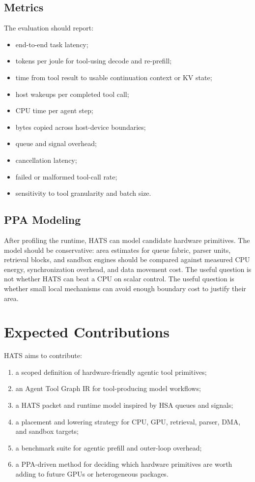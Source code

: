 \documentclass[11pt]{article}
\begin{document}
\subsection{Metrics}

The evaluation should report:

\begin{itemize}[leftmargin=*]
  \item end-to-end task latency;
  \item tokens per joule for tool-using decode and re-prefill;
  \item time from tool result to usable continuation context or KV state;
  \item host wakeups per completed tool call;
  \item CPU time per agent step;
  \item bytes copied across host-device boundaries;
  \item queue and signal overhead;
  \item cancellation latency;
  \item failed or malformed tool-call rate;
  \item sensitivity to tool granularity and batch size.
\end{itemize}

\subsection{PPA Modeling}

After profiling the runtime, HATS can model candidate hardware primitives. The
model should be conservative: area estimates for queue fabric, parser units,
retrieval blocks, and sandbox engines should be compared against measured CPU
energy, synchronization overhead, and data movement cost. The useful question is
not whether HATS can beat a CPU on scalar control. The useful question is
whether small local mechanisms can avoid enough boundary cost to justify their
area.

\section{Expected Contributions}

HATS aims to contribute:

\begin{enumerate}[leftmargin=*]
  \item a scoped definition of hardware-friendly agentic tool primitives;
  \item an Agent Tool Graph IR for tool-producing model workflows;
  \item a HATS packet and runtime model inspired by HSA queues and signals;
  \item a placement and lowering strategy for CPU, GPU, retrieval, parser, DMA,
        and sandbox targets;
  \item a benchmark suite for agentic prefill and outer-loop overhead;
  \item a PPA-driven method for deciding which hardware primitives are worth
        adding to future GPUs or heterogeneous packages.
\end{enumerate}
\end{document}
